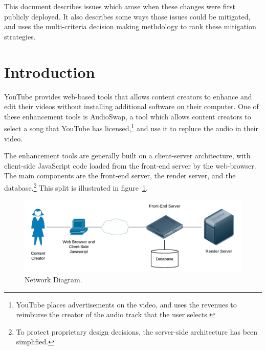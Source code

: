 \documentclass[se,resubmit]{uw-wkrpt}
\begin{document}
This document describes issues which arose when these changes were first
publicly deployed. It also describes some ways those issues could be
mitigated, and uses the multi-criteria decision making methdology to rank
these mitigation strategies.

\tableofcontents
\listoffigures
\listoftables

\mainmatter

\section{Introduction}\label{sec:intro}
YouTube provides web-based tools that allows content creators to enhance and
edit their videos without installing additional software on their computer. One
of these enhancement tools is AudioSwap, a tool which allows content creators
to select a song that YouTube has licensed,\footnote{YouTube places
advertisements on the video, and uses the revenues to reimburse the creator of
the audio track that the user selects.} and use it to repluce the audio in
their video.

The enhancement tools are generally built on a client-server architecture,
with client-side JavaScript code loaded from the front-end server by the
web-browser. The main components are the front-end server, the render
server, and the database.\footnote{To protect proprietary design decisions,
the server-side architecture has been simplified.}
This split is illustrated in figure~\ref{fig:network-diagram}.

\begin{figure}
  \centering
  \includegraphics{network-diagram}
  \caption{Network Diagram.}
  \label{fig:network-diagram}
\end{figure}
\end{document}
